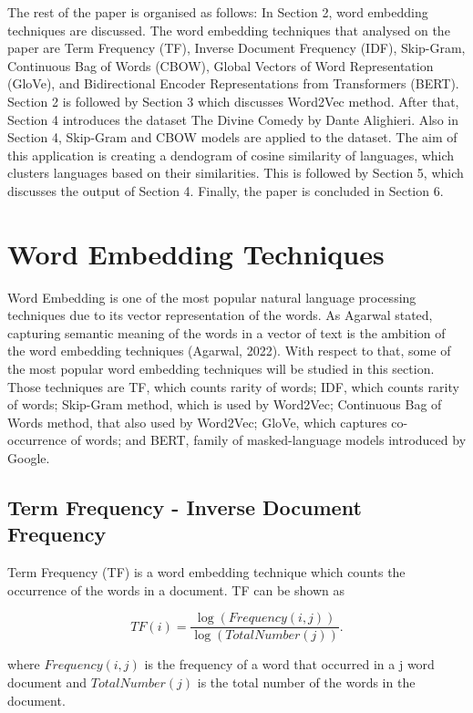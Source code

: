 \documentclass[man]{apa7}
\begin{document}
The rest of the paper is organised as follows: In Section 2, word embedding techniques are discussed. The word embedding techniques that analysed on the paper are Term Frequency (TF), Inverse Document Frequency (IDF), Skip-Gram, Continuous Bag of Words (CBOW), Global Vectors of Word Representation (GloVe), and Bidirectional Encoder Representations from Transformers (BERT). Section 2 is followed by Section 3 which discusses Word2Vec method. After that, Section 4 introduces the dataset The Divine Comedy by Dante Alighieri. Also in Section 4, Skip-Gram and CBOW models are applied to the dataset. The aim of this application is creating a dendogram of cosine similarity of languages, which clusters languages based on their similarities. This is followed by Section 5, which discusses the output of Section 4. Finally, the paper is concluded in Section 6.

\section{Word Embedding Techniques}
Word Embedding is one of the most popular natural language processing techniques due to its vector representation of the words. As Agarwal stated, capturing semantic meaning of the words in a vector of text is the ambition of the word embedding techniques (Agarwal, 2022). With respect to that, some of the most popular word embedding techniques will be studied in this section. Those techniques are TF, which counts rarity of words; IDF, which counts rarity of words; Skip-Gram method, which is used by Word2Vec; Continuous Bag of Words method, that also used by Word2Vec;  GloVe, which captures co-occurrence of words; and BERT, family of masked-language models introduced by Google.

\subsection{Term Frequency - Inverse Document Frequency}
Term Frequency (TF) is a word embedding technique which counts the occurrence of the words in a document. TF can be shown as

\begin{equation}
TF(i) =   \frac{\log(Frequency(i,j))}{\log(TotalNumber(j))}.
\end{equation}

where $Frequency(i,j)$ is the frequency of a word that occurred in a j word document and $TotalNumber(j)$ is the total number of the words in the document.
\end{document}
